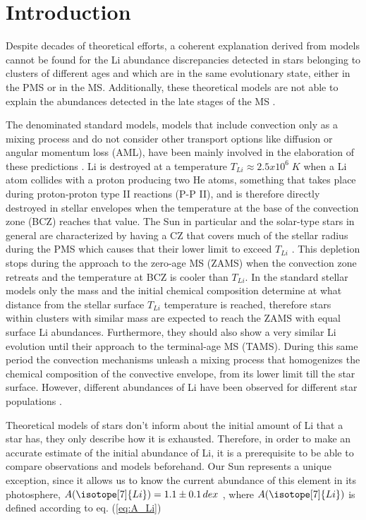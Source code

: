 \documentclass[fleqn,usenatbib]{mnras}
\begin{document}

\section{Introduction} \label{sec_1}
Despite decades of theoretical efforts, a coherent explanation derived from models cannot be found for the Li abundance discrepancies detected in stars belonging to clusters of different ages and which are in the same evolutionary state, either in the PMS or in the MS. Additionally, these theoretical models are not able to explain the abundances detected in the late stages of the MS \citep{Tschape2001}.\par

The denominated standard models, models that include convection only as a mixing process and do not consider other transport options like diffusion or angular momentum loss (AML), have been mainly involved in the elaboration of these predictions \citep{Sestito2005}. Li is destroyed at a temperature $T_{Li} \approx 2.5 x 10^6\; K$ when a Li atom collides with a proton producing two He atoms, something that takes place during proton-proton type II reactions (P-P II), and is therefore directly destroyed in stellar envelopes when the temperature at the base of the convection zone (BCZ) reaches that value. The Sun in particular and the solar-type stars in general are characterized by having a CZ that covers much of the stellar radius during the PMS which causes that their lower limit to exceed $T_{Li}$ \citep{Iben1965}. This depletion stops during the approach to the zero-age MS (ZAMS) when the convection zone retreats and the temperature at BCZ is cooler than $T_{Li}$. In the standard stellar models only the mass and the initial chemical composition determine at what distance from the stellar surface $T_{Li}$ temperature is reached, therefore stars within clusters with similar mass are expected to reach the ZAMS with equal surface Li abundances. Furthermore, they should also show a very similar Li evolution until their approach to the terminal-age MS (TAMS). During this same period the convection mechanisms unleash a mixing process that homogenizes the chemical composition of the convective envelope, from its lower limit till the star surface. However, different abundances of Li have been observed for different star populations \citep[][and references therein]{Somers2014}.\par

Theoretical models of stars don't inform about the initial amount of Li that a star has, they only describe how it is exhausted. Therefore, in order to make an accurate estimate of the initial abundance of Li, it is a prerequisite to be able to compare observations and models beforehand. Our Sun represents a unique exception, since it allows us to know the current abundance of this element in its photosphere, $A(\isotope[7]{Li}) = 1.1 \pm 0.1 \, dex$ \citep{Jeffries2004}, where $A(\isotope[7]{Li})$ is defined according to eq. (\ref{eq:A_Li})\par
\end{document}
